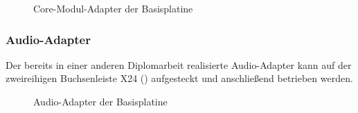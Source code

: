 \begin{figure}[H]
    \centering
    \qquad
    \qquad
    \caption[Core-Modul-Adapter der Basisplatine]{\gls{Core-Modul}-Adapter der \gls{Basisplatine}}
    \label{fig:basisplatine-core}
\end{figure}

\subsubsection{Audio-Adapter}
Der bereits in einer anderen Diplomarbeit realisierte Audio-Adapter kann auf der zweireihigen Buchsenleiste X24 () aufgesteckt und anschließend betrieben werden.

\begin{figure}[H]
    \centering
    \qquad
    \qquad
    \caption[Audio-Adapter der Basisplatine]{Audio-Adapter der \gls{Basisplatine}}
    \label{fig:basisplatine-audio}
\end{figure}

